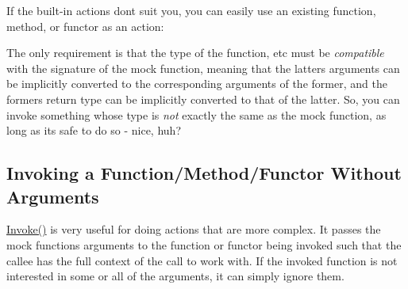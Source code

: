 If the built-\/in actions don\textquotesingle{}t suit you, you can easily use an existing function, method, or functor as an action\+:


\begin{DoxyCode}{0}
\DoxyCodeLine{}
\DoxyCodeLine{\};}
\DoxyCodeLine{}
\DoxyCodeLine{}
\DoxyCodeLine{\};}
\DoxyCodeLine{}
\DoxyCodeLine{}
\end{DoxyCode}


The only requirement is that the type of the function, etc must be {\itshape compatible} with the signature of the mock function, meaning that the latter\textquotesingle{}s arguments can be implicitly converted to the corresponding arguments of the former, and the former\textquotesingle{}s return type can be implicitly converted to that of the latter. So, you can invoke something whose type is {\itshape not} exactly the same as the mock function, as long as it\textquotesingle{}s safe to do so -\/ nice, huh?

\subsection*{Invoking a Function/\+Method/\+Functor Without Arguments}

{\ttfamily \mbox{\hyperlink{namespacetesting_a12aebaf8363d49a383047529f798b694}{Invoke()}}} is very useful for doing actions that are more complex. It passes the mock function\textquotesingle{}s arguments to the function or functor being invoked such that the callee has the full context of the call to work with. If the invoked function is not interested in some or all of the arguments, it can simply ignore them.

